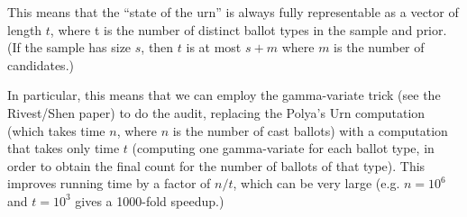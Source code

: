 \documentclass[10pt,a4paper]{article}
\begin{document}
{This means that the ``state of the urn'' is always fully representable
as a vector of length $t$, where t is the number of distinct ballot
types in the sample and prior.  (If the sample has size $s$, then $t$
is at most $s+m$ where $m$ is the number of candidates.)

In particular, this means that we can employ the gamma-variate
trick (see the Rivest/Shen paper) to do the audit, replacing the Polya's Urn
computation (which takes time $n$, where $n$ is the number of cast
ballots) with a computation that takes only time $t$ (computing
one gamma-variate for each ballot type, in order to obtain the
final count for the number of ballots of that type).  This improves
running time by a factor of $n/t$, which can be very large (e.g.
$n=10^6$ and $t=10^3$ gives a 1000-fold speedup.)

} %
\end{document}
